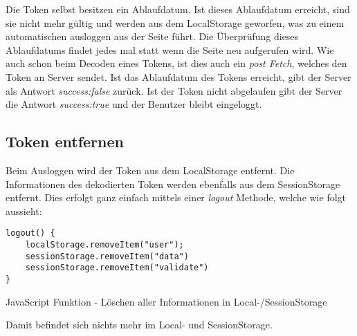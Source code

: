 Die Token selbst besitzen ein Ablaufdatum. Ist dieses Ablaufdatum erreicht, sind sie nicht mehr 
gültig und werden aus dem LocalStorage geworfen, was zu einem automatischen ausloggen aus der Seite führt. Die Überprüfung dieses Ablaufdatums 
findet jedes mal statt wenn die Seite neu aufgerufen wird. Wie auch schon beim Decoden eines Tokens,
ist dies auch ein \textit{post Fetch}, welches den Token an Server sendet. Ist das Ablaufdatum des
Tokens erreicht, gibt der Server als Antwort \textit{success:false} zurück. 
Ist der Token nicht abgelaufen gibt der Server die Antwort \textit{success:true} und 
der Benutzer bleibt eingeloggt. 

\subsection{Token entfernen}

Beim Ausloggen wird der Token aus dem LocalStorage entfernt. Die Informationen des dekodierten Token 
werden ebenfalls aus dem SessionStorage entfernt. Dies erfolgt ganz einfach mittels einer \textit{logout}
Methode, welche wie folgt aussieht:

\begin{code}[htp]
\begin{lstlisting}
logout() {
    localStorage.removeItem("user");
    sessionStorage.removeItem("data")
    sessionStorage.removeItem("validate")
}    
\end{lstlisting}
\caption{JavaScript Funktion - Löschen aller Informationen in Local-/SessionStorage}
\end{code}
Damit befindet sich nichts mehr im Local- und SessionStorage.
